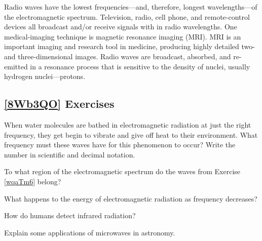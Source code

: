 \documentclass{article}
\numberwithin{equation}{section}
\numberwithin{figure}{section}
\begin{document}
Radio waves have the lowest frequencies---and, therefore, longest wavelengths---of the electromagnetic spectrum. Television, radio, cell phone, and remote-control devices all broadcast and/or receive signals with in radio wavelengths. One medical-imaging technique is magnetic resonance imaging (MRI). MRI is an important imaging and research tool in medicine, producing highly detailed two- and three-dimensional images. Radio waves are broadcast, absorbed, and re-emitted in a resonance process that is sensitive to the density of nuclei, usually hydrogen nuclei---protons.

\clearpage
\subsection*{\ref{8Wb3QO} Exercises}


\begin{exercise} \label{wqaTm6}
    When water molecules are bathed in electromagnetic radiation at just the right frequency, they get begin to vibrate and give off heat to their environment. What frequency must these waves have for this phenomenon to occur? Write the number in scientific and decimal notation.
\end{exercise}

\begin{exercise}
    To what region of the electromagnetic spectrum do the waves from Exercise \ref{wqaTm6} belong? 
\end{exercise}

\begin{exercise}
    What happens to the energy of electromagnetic radiation as frequency decreases?
\end{exercise}

\begin{exercise}
    How do humans detect infrared radiation?
\end{exercise}

\begin{exercise}
    Explain some applications of microwaves in astronomy. 
\end{exercise}
\end{document}
